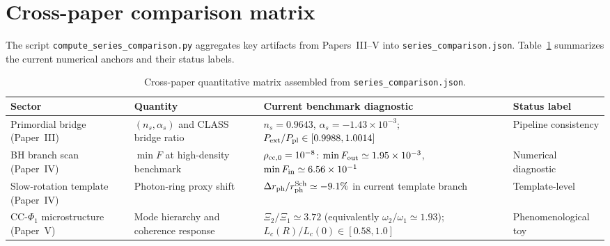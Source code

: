\documentclass[aps,prd,onecolumn,nofootinbib,superscriptaddress]{revtex4-2}
\begin{document}
\section{Cross-paper comparison matrix}
The script \texttt{compute\_series\_comparison.py} aggregates key artifacts from Papers~III--V into
\texttt{series\_comparison.json}.
Table~\ref{tab:paper6-matrix} summarizes the current numerical anchors and their status labels.
\begin{table}[t]
  \centering
  \begin{tabular}{llll}
    \hline\hline
    Sector & Quantity & Current benchmark diagnostic & Status label \\
    \hline
    Primordial bridge (Paper~III) &
    $(n_s,\alpha_s)$ and CLASS bridge ratio &
    $n_s = 0.9643$, $\alpha_s = -1.43\times 10^{-3}$; $P_{\rm ext}/P_{\rm pl}\in[0.9988,1.0014]$ &
    Pipeline consistency \\
    \hline
    BH branch scan (Paper~IV) &
    $\min F$ at high-density benchmark &
    $\rho_{\rm cc,0}=10^{-8}$: $\min F_{\rm out}\simeq1.95\times10^{-3}$, $\min F_{\rm in}\simeq6.56\times10^{-1}$ &
    Numerical diagnostic \\
    \hline
    Slow-rotation template (Paper~IV) &
    Photon-ring proxy shift &
    $\Delta r_{\rm ph}/r_{\rm ph}^{\rm Sch}\simeq-9.1\%$ in current template branch &
    Template-level \\
    \hline
    CC-$\Phi_1$ microstructure (Paper~V) &
    Mode hierarchy and coherence response &
    $\Xi_2/\Xi_1 \simeq 3.72$ (equivalently $\omega_2/\omega_1\simeq1.93$); $L_c(R)/L_c(0)\in[0.58,1.0]$ &
    Phenomenological toy \\
    \hline\hline
  \end{tabular}
  \caption{Cross-paper quantitative matrix assembled from \texttt{series\_comparison.json}.}
  \label{tab:paper6-matrix}
\end{table}
\end{document}
